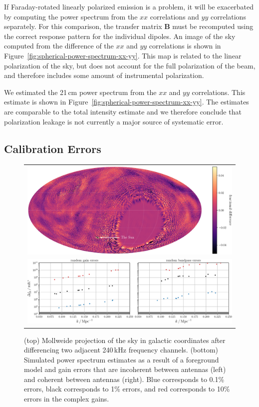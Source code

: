 \documentclass[twocolumn]{aastex62}
\renewcommand{\b}{\pmb}
\begin{document}
If Faraday-rotated linearly polarized emission is a problem, it will be exacerbated by computing the
power spectrum from the $xx$ correlations and $yy$ correlations separately. For this comparison, the
transfer matrix $\b B$ must be recomputed using the correct response pattern for the individual
dipoles. An image of the sky computed from the difference of the $xx$ and $yy$ correlations is shown
in Figure~\ref{fig:spherical-power-spectrum-xx-yy}. This map is related to the linear polarization
of the sky, but does not account for the full polarization of the beam, and therefore includes some
amount of instrumental polarization.

We estimated the 21\,cm power spectrum from the $xx$ and $yy$ correlations. This estimate is shown
in Figure~\ref{fig:spherical-power-spectrum-xx-yy}. The estimates are comparable to the total
intensity estimate and we therefore conclude that polarization leakage is not currently a major
source of systematic error.

\subsection{Calibration Errors}\label{sec:calibration-errors}

\begin{figure}
    \centering
    \begin{tabular}{c}
        \includegraphics[width=\textwidth]{channel-difference-sky-map-colorbar}\\
        \includegraphics[width=\textwidth]{spherical-power-spectrum-gain-errors}\\
    \end{tabular}
    \caption{
        (top) Mollweide projection of the sky in galactic coordinates after differencing two
        adjacent 240\,kHz frequency channels.
        (bottom) Simulated power spectrum estimates as a result of a foreground model and gain
        errors that are incoherent between antennas (left) and coherent between antennas (right).
        Blue corresponds to 0.1\% errors, black corresponds to 1\% errors, and red corresponds to
        10\% errors in the complex gains.
    }
    \label{fig:spherical-power-spectrum-gain-errors}
\end{figure}
\end{document}

